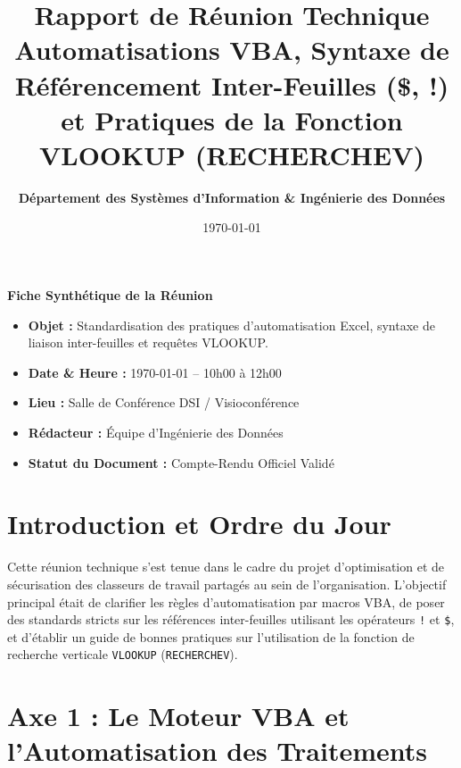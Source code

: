 \documentclass[12pt,a4paper]{article}
\title{\Huge \textbf{Rapport de Réunion Technique}\\[0.8em]
\Large Automatisations VBA, Syntaxe de Référencement Inter-Feuilles (\$, !) et Pratiques de la Fonction VLOOKUP (RECHERCHEV)}
\author{\textbf{Département des Systèmes d'Information \& Ingénierie des Données}}
\date{\today}
\begin{document}
\maketitle

\begin{mdframed}[backgroundcolor=backcolour,linecolor=primaryblue,linewidth=1.5pt]
\textbf{Fiche Synthétique de la Réunion}
\begin{itemize}
    \item \textbf{Objet :} Standardisation des pratiques d'automatisation Excel, syntaxe de liaison inter-feuilles et requêtes VLOOKUP.
    \item \textbf{Date \& Heure :} \today{} -- 10h00 à 12h00
    \item \textbf{Lieu :} Salle de Conférence DSI / Visioconférence
    \item \textbf{Rédacteur :} Équipe d'Ingénierie des Données
    \item \textbf{Statut du Document :} Compte-Rendu Officiel Validé
\end{itemize}
\end{mdframed}

\vspace{1em}
\tableofcontents
\newpage

\section{Introduction et Ordre du Jour}
Cette réunion technique s'est tenue dans le cadre du projet d'optimisation et de sécurisation des classeurs de travail partagés au sein de l'organisation. L'objectif principal était de clarifier les règles d'automatisation par macros VBA, de poser des standards stricts sur les références inter-feuilles utilisant les opérateurs \texttt{!} et \texttt{\$}, et d'établir un guide de bonnes pratiques sur l'utilisation de la fonction de recherche verticale \texttt{VLOOKUP} (\texttt{RECHERCHEV}).

\section{Axe 1 : Le Moteur VBA et l'Automatisation des Traitements}
\end{document}
